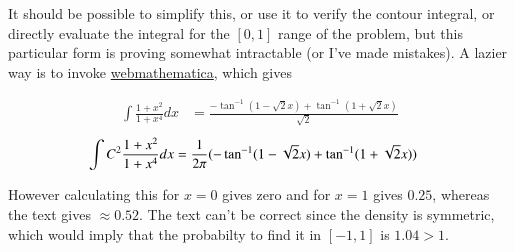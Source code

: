 \documentclass{article}
\begin{document}

%

%


It should be possible to simplify this, or use it to verify the contour integral, or directly evaluate the integral for the $[0,1]$ range of the problem,
but this particular form is proving somewhat intractable (or I've made mistakes).  A lazier way is to invoke \href{http://integrals.wolfram.com/index.jsp}{webmathematica}, which gives

\begin{align*}
\int \frac{1 + x^2}{1 + x^4} dx &=
\frac{-\tan^{-1}(1 - \sqrt{2} x) + \tan^{-1}(1 + \sqrt{2} x)}{ \sqrt{2} }
\end{align*}
\begin{align*}
\int C^2 \frac{1 + x^2}{1 + x^4} dx &=
\frac{1}{2 \pi} (-\tan^{-1}(1 - \sqrt{2} x) + \tan^{-1}(1 + \sqrt{2} x))
\end{align*}

However calculating this for $x=0$ gives zero and for $x=1$ gives $0.25$, whereas the text gives $\approx 0.52$.  The text can't be correct since the density is symmetric, which would imply that the probabilty to find it in $[-1,1]$ is $1.04 > 1$.
\end{document}
